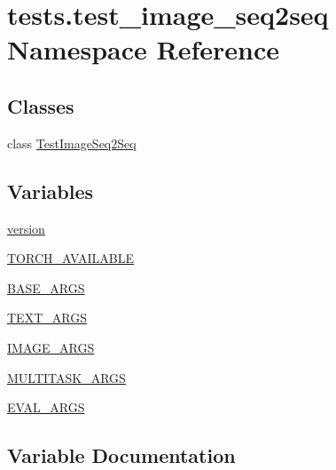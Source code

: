 \hypertarget{namespacetests_1_1test__image__seq2seq}{}\section{tests.\+test\+\_\+image\+\_\+seq2seq Namespace Reference}
\label{namespacetests_1_1test__image__seq2seq}
\subsection*{Classes}
\begin{DoxyCompactItemize}
\item 
class \hyperlink{classtests_1_1test__image__seq2seq_1_1TestImageSeq2Seq}{Test\+Image\+Seq2\+Seq}
\end{DoxyCompactItemize}
\subsection*{Variables}
\begin{DoxyCompactItemize}
\item 
\hyperlink{namespacetests_1_1test__image__seq2seq_a4b00cedade43b72af4f1b8e901963288}{version}
\item 
\hyperlink{namespacetests_1_1test__image__seq2seq_ae75258e5ad4e726ccc65f144eee7550f}{T\+O\+R\+C\+H\+\_\+\+A\+V\+A\+I\+L\+A\+B\+LE}
\item 
\hyperlink{namespacetests_1_1test__image__seq2seq_ae4f6e6f6da0967c2ca3900b5e02e021d}{B\+A\+S\+E\+\_\+\+A\+R\+GS}
\item 
\hyperlink{namespacetests_1_1test__image__seq2seq_a74b28be5819942d26b6394c4ebd89aa0}{T\+E\+X\+T\+\_\+\+A\+R\+GS}
\item 
\hyperlink{namespacetests_1_1test__image__seq2seq_a1b15fddfbe9d8501f736a6fbd51e868c}{I\+M\+A\+G\+E\+\_\+\+A\+R\+GS}
\item 
\hyperlink{namespacetests_1_1test__image__seq2seq_a3f89c36ed65de556f34e84fa856aca88}{M\+U\+L\+T\+I\+T\+A\+S\+K\+\_\+\+A\+R\+GS}
\item 
\hyperlink{namespacetests_1_1test__image__seq2seq_a931d04a6fdeaa99dca09cb447abc74cb}{E\+V\+A\+L\+\_\+\+A\+R\+GS}
\end{DoxyCompactItemize}


\subsection{Variable Documentation}
\mbox{\label{namespacetests_1_1test__image__seq2seq_ae4f6e6f6da0967c2ca3900b5e02e021d}} 
